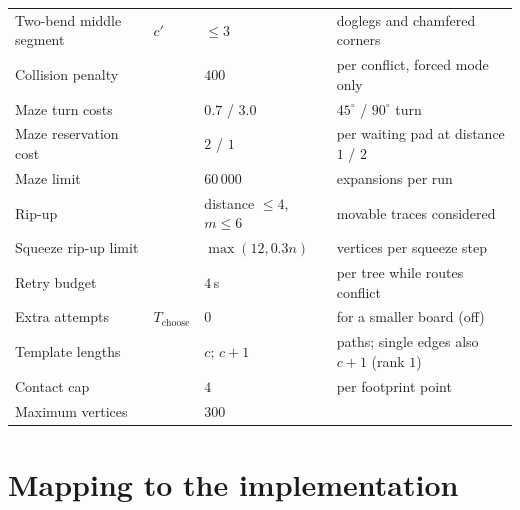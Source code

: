 \documentclass[11pt,a4paper]{article}
\theoremstyle{remark}
\begin{document}
\begin{tabularx}{\textwidth}{@{}lllX@{}}
Two-bend middle segment & $c'$ & $\le 3$ & doglegs and chamfered corners \\
Collision penalty & & $400$ & per conflict, forced mode only \\
Maze turn costs & & $0.7$ / $3.0$ & $45^\circ$ / $90^\circ$ turn \\
Maze reservation cost & & $2$ / $1$ & per waiting pad at distance $1$ / $2$ \\
Maze limit & & $60\,000$ & expansions per run \\
Rip-up & & distance $\le4$, $m\le6$ & movable traces considered \\
Squeeze rip-up limit & & $\max(12, 0.3n)$ & vertices per squeeze step \\
Retry budget & & $4$\,s & per tree while routes conflict \\
Extra attempts & $T_{\mathrm{choose}}$ & $0$ & for a smaller board (off) \\
Template lengths & & $c$; $c+1$ & paths; single edges also $c+1$ (rank $1$) \\
Contact cap & & $4$ & per footprint point \\
Maximum vertices & & $300$ & \\
\bottomrule
\end{tabularx}\par\endgroup

\section{Mapping to the implementation}
\end{document}
